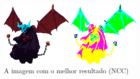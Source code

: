 \begin{figure}[h!]
	\caption{A imagem com o melhor resultado (NCC)}
    \label{fig:bestncc}
    \centering
    \begin{minipage}[b]{0.25\textwidth}
        \includegraphics[width=\textwidth]{imagens/demon-idle.png}
    \end{minipage}
    \hfill
    \begin{minipage}[b]{0.25\textwidth}
        \includegraphics[width=\textwidth]{imagens/demon-idle.expected.png}

\end{minipage}
\end{figure}
